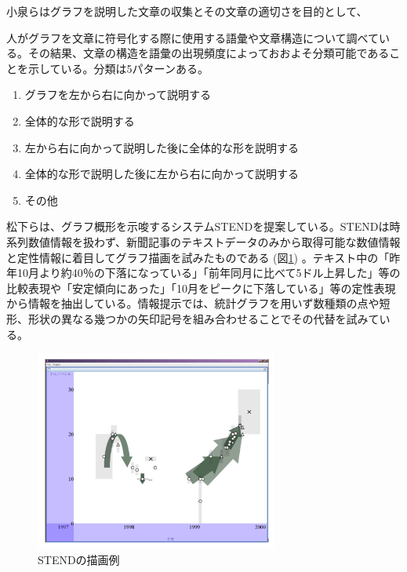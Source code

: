 \documentclass{matsushita-zemi}
\begin{document}


小泉らはグラフを説明した文章の収集とその文章の適切さを目的として、

人がグラフを文章に符号化する際に使用する語彙や文章構造について調べている\cite{interconversion}。その結果、文章の構造を語彙の出現頻度によっておおよそ分類可能であることを示している。分類は5パターンある。
\begin{enumerate}
 \item グラフを左から右に向かって説明する
 \item 全体的な形で説明する
 \item 左から右に向かって説明した後に全体的な形を説明する
 \item 全体的な形で説明した後に左から右に向かって説明する
 \item その他
\end{enumerate}

松下らは、グラフ概形を示唆するシステムSTENDを提案している\cite{STEND}。STENDは時系列数値情報を扱わず、新聞記事のテキストデータのみから取得可能な数値情報と定性情報に着目してグラフ描画を試みたものである (図\ref{STEND}) 。テキスト中の「昨年10月より約40％の下落になっている」「前年同月に比べて5ドル上昇した」等の比較表現や「安定傾向にあった」「10月をピークに下落している」等の定性表現から情報を抽出している。情報提示では、統計グラフを用いず数種類の点や短形、形状の異なる幾つかの矢印記号を組み合わせることでその代替を試みている。
\begin{figure}[tb]
  \begin{center}
   \includegraphics[width=8cm,bb=0 0 512 422]{STEND.PNG}
  \end{center}
 \caption{STENDの描画例}
 \label{STEND}
\end{figure}
\end{document}

